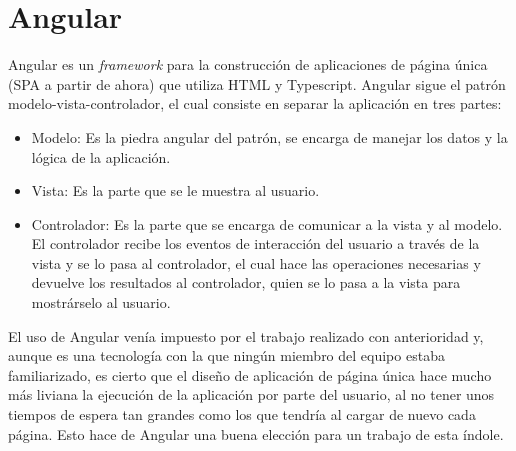 \documentclass[11pt]{book}
\begin{document}
\section{Angular}
Angular es un \emph{framework} para la construcción de aplicaciones de página única (SPA a partir de ahora) que utiliza HTML y Typescript. Angular sigue el patrón modelo-vista-controlador, el cual consiste en separar la aplicación en tres partes:
\begin{itemize}
	\item Modelo: Es la piedra angular del patrón, se encarga de manejar los datos y la lógica de la aplicación.
	\item Vista: Es la parte que se le muestra al usuario.
	\item Controlador: Es la parte que se encarga de comunicar a la vista y al modelo. El controlador recibe los eventos de interacción del usuario a través de la vista y se lo pasa al controlador, el cual hace las operaciones necesarias y devuelve los resultados al controlador, quien se lo pasa a la vista para mostrárselo al usuario.
\end{itemize}


El uso de Angular venía impuesto por el trabajo realizado con anterioridad y, aunque es una tecnología con la que ningún miembro del equipo estaba familiarizado, es cierto que el diseño de aplicación de página única hace mucho más liviana la ejecución de la aplicación por parte del usuario, al no tener unos tiempos de espera tan grandes como los que tendría al cargar de nuevo cada página. Esto hace de Angular una buena elección para un trabajo de esta índole.
\end{document}
